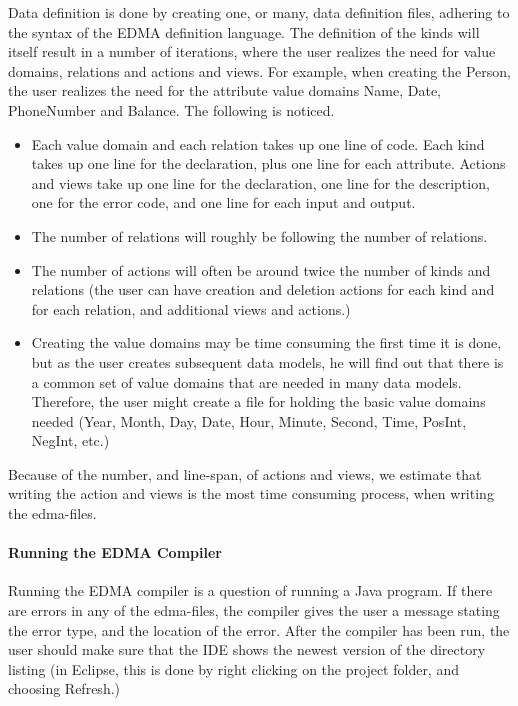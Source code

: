 Data definition is done by creating one, or many, data definition
files, adhering to the syntax of the EDMA definition language. The
definition of the kinds will itself result in a number of iterations,
where the user realizes the need for value domains, relations and
actions and views. For example, when creating the Person, the user
realizes the need for the attribute value domains Name, Date, PhoneNumber
and Balance. The following is noticed.
\begin{itemize}
\item Each value domain and each relation takes up one line of code. Each
kind takes up one line for the declaration, plus one line for each
attribute. Actions and views take up one line for the declaration,
one line for the description, one for the error code, and one line
for each input and output.
\item The number of relations will roughly be following the number of relations.
\item The number of actions will often be around twice the number of kinds
and relations (the user can have creation and deletion actions for
each kind and for each relation, and additional views and actions.)
\item Creating the value domains may be time consuming the first time it
is done, but as the user creates subsequent data models, he will find
out that there is a common set of value domains that are needed in
many data models. Therefore, the user might create a file for holding
the basic value domains needed (Year, Month, Day, Date, Hour, Minute,
Second, Time, PosInt, NegInt, etc.)
\end{itemize}
Because of the number, and line-span, of actions and views, we estimate
that writing the action and views is the most time consuming process,
when writing the edma-files.


\paragraph{Running the EDMA Compiler}

Running the EDMA compiler is a question of running a Java program.
If there are errors in any of the edma-files, the compiler gives the
user a message stating the error type, and the location of the error.
After the compiler has been run, the user should make sure that the
IDE shows the newest version of the directory listing (in Eclipse,
this is done by right clicking on the project folder, and choosing
Refresh.)


